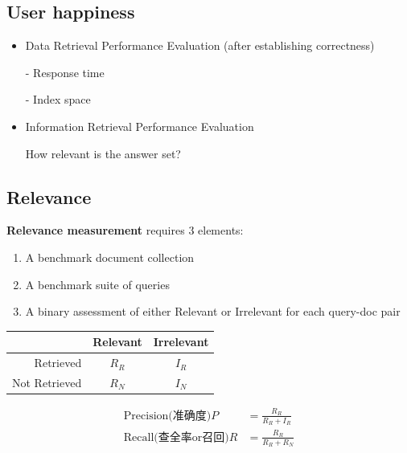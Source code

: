\documentclass{article}
\begin{document}
\subsection{User happiness}
\begin{itemize}
    \item Data Retrieval Performance Evaluation (after establishing correctness)\par
    - Response time\par
    - Index space\par
    \item Information Retrieval Performance Evaluation\par
    How relevant is the answer set?\par
\end{itemize}

\subsection{Relevance}
\textbf{Relevance measurement} requires 3 elements:
\begin{enumerate}
    \item A benchmark document collection
    \item A benchmark suite of queries
    \item A binary assessment of either Relevant or Irrelevant for each query-doc pair
\end{enumerate}

\begin{table}[htbp]
    \centering
    \begin{tabular}[c]{|r|c|c|}\hline
        & Relevant & Irrelevant\\ \hline
        Retrieved & $R_R$ & $I_R$\\ \hline
        Not Retrieved & $R_N$ & $I_N$ \\  \hline
    \end{tabular}
\end{table}

\begin{align*}
    \text{Precision(准确度)}P&=\frac{R_R}{R_R+I_R}\\
    \text{Recall(查全率or召回)}R&=\frac{R_R}{R_R+R_N}
\end{align*}
\end{document}
